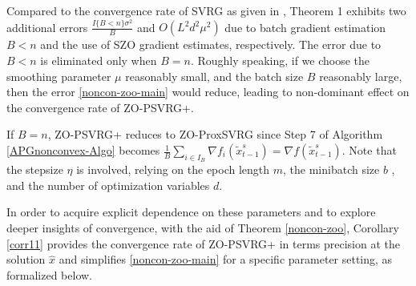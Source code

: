\documentclass{article}
\theoremstyle{definition}
\theoremstyle{remark}
\begin{document}
{\color{Brown}
Compared to the convergence rate of SVRG as given in \cite{reddi2016proximal}, Theorem 1 exhibits two
additional errors $\frac{I\{B < n\}\sigma ^2}{B}$ and $O(L^2d^2\mu^2)$ due to batch gradient estimation $B < n$ and the use of SZO gradient estimates, respectively. The error due to $B < n$ is eliminated only when $B = n$. Roughly
speaking, if we choose the smoothing parameter $\mu$ reasonably small, and the batch size $B$ reasonably large, then the error \eqref{noncon-zoo-main}
would reduce, leading to non-dominant effect on the convergence rate of ZO-PSVRG+. 

{\color{Brown}
If $B = n$, ZO-PSVRG+ reduces to ZO-ProxSVRG  since Step 7 of Algorithm \ref{APGnonconvex-Algo} becomes
$\frac{1}{B}\sum_{i\in I_B} \nabla f_i(\widetilde{x}^s_{t-1}) = \nabla f(\widetilde{x}^s_{t-1})$. }
Note that the stepsize  $\eta$ is involved, relying on the epoch length $m$, the minibatch size $b$ , and the number of optimization variables $d$. 
}

{\color{Brown}
In order to acquire explicit dependence on these parameters and to explore deeper insights of convergence, with the aid of Theorem \ref{noncon-zoo}, Corollary \ref{corr11} provides the convergence rate of ZO-PSVRG+ in terms precision at the solution $\hat{x}$ and  simplifies \eqref{noncon-zoo-main} for a specific parameter setting, as formalized below.
}
\end{document}
